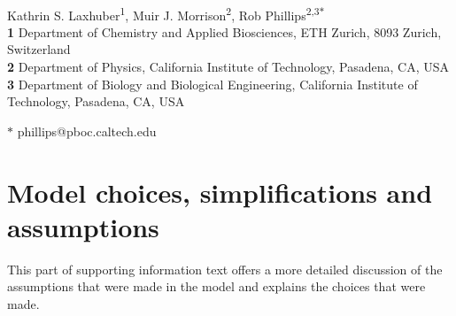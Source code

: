 \documentclass[10pt,letterpaper]{article}
\begin{document}
	
\begin{flushleft}
	{\Large
		\textbf{}
	}
	\newline
		\\
	Kathrin S. Laxhuber\textsuperscript{1},
	Muir J. Morrison\textsuperscript{2},
	Rob Phillips\textsuperscript{2,3$\ast$}
	\\
	\bigskip
	\textbf{1} Department of Chemistry and Applied Biosciences, ETH Zurich, 8093 Zurich, Switzerland
	\\
	\textbf{2} Department of Physics, California Institute of Technology, Pasadena, CA, USA
	\\
	\textbf{3} Department of Biology and Biological Engineering, California Institute of Technology, Pasadena, CA, USA
	\\
	\bigskip
	
	
	
	
	
	
	$\ast$ phillips@pboc.caltech.edu
	
\end{flushleft}	

\newpage

\section{Model choices, simplifications and assumptions}
This part of supporting information text offers a more detailed discussion of the assumptions that were made in the model and explains the choices that were made.
\end{document}
